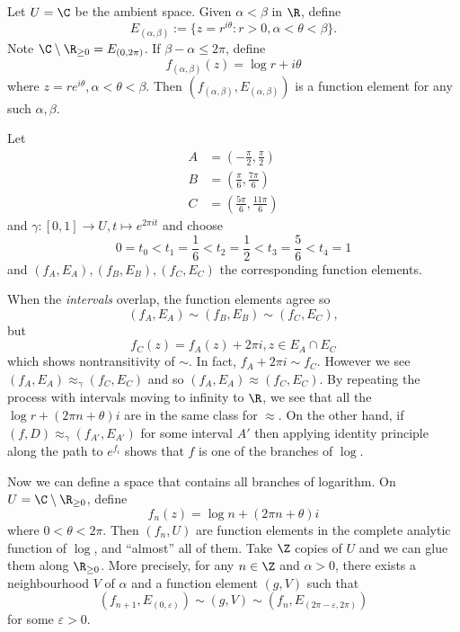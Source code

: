 \documentclass[a4paper]{article}
\begin{document}
\begin{eg}
  Let \(U = \C\) be the ambient space. Given \(\alpha < \beta\) in \(\R\), define
  \[
    E_{(\alpha, \beta)} := \{z = r^{i \theta}: r > 0, \alpha < \theta < \beta\}.
  \]
  Note \(\C \setminus \R_{\geq 0} = E_{(0, 2\pi)}\). If \(\beta - \alpha \leq 2\pi\), define
  \[
    f_{(\alpha, \beta)}(z) = \log r + i\theta
  \]
  where \(z = re^{i\theta}, \alpha < \theta < \beta\). Then \((f_{(\alpha, \beta)}, E_{(\alpha, \beta)})\) is a function element for any such \(\alpha, \beta\).

  Let
  \begin{align*}
    A &= (-\frac{\pi}{2}, \frac{\pi}{2}) \\
    B &= (\frac{\pi}{6}, \frac{7\pi}{6}) \\
    C &= (\frac{5\pi}{6}, \frac{11\pi}{6})
  \end{align*}
  and \(\gamma: [0, 1] \to U, t \mapsto e^{2\pi i t}\) and choose
  \[
    0 = t_0 < t_1 = \frac{1}{6} < t_2 = \frac{1}{2} < t_3 = \frac{5}{6} < t_4 = 1
  \]
  and \((f_A, E_A), (f_B, E_B), (f_C, E_C)\) the corresponding function elements.

  When the \emph{intervals} overlap, the function elements agree so
  \[
    (f_A, E_A) \sim (f_B, E_B) \sim (f_C, E_C),
  \]
  but
  \[
    f_C(z) = f_A(z) + 2\pi i, z \in E_A \cap E_C
  \]
  which shows nontransitivity of \(\sim\). In fact, \(f_A + 2\pi i \sim f_C\). However we see \((f_A, E_A) \approx_\gamma (f_C, E_C)\) and so \((f_A, E_A) \approx (f_C, E_C)\). By repeating the process with intervals moving to infinity to \(\R\), we see that all the \(\log r + (2\pi n + \theta) i\) are in the same class for \(\approx\). On the other hand, if \((f, D) \approx_\gamma (f_{A'}, E_{A'})\) for some interval \(A'\) then applying identity principle along the path to \(e^{f_i}\) shows that \(f\) is one of the branches of \(\log\).

  Now we can define a space that contains all branches of logarithm. On \(U = \C \setminus \R_{\geq 0}\), define
  \[
    f_n(z) = \log n + (2\pi n + \theta)i
  \]
  where \(0 < \theta < 2\pi\). Then \((f_n, U)\) are function elements in the complete analytic function of \(\log\), and ``almost'' all of them. Take \(\Z\) copies of \(U\) and we can glue them along \(\R_{\geq 0}\). More precisely, for any \(n \in \Z\) and \(\alpha > 0\), there exists a neighbourhood \(V\) of \(\alpha\) and a function element \((g, V)\) such that
  \[
    (f_{n + 1}, E_{(0, \varepsilon)}) \sim (g, V) \sim (f_n, E_{(2\pi - \varepsilon, 2\pi)})
  \]
  for some \(\varepsilon > 0\).


\end{eg}
\end{document}
